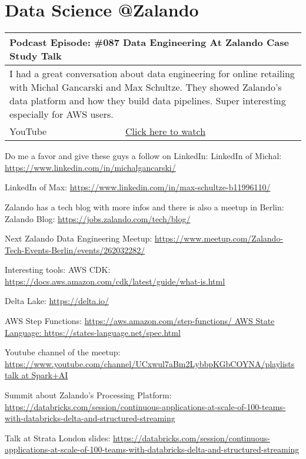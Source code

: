 \documentclass[12pt, numbers=noenddot]{scrreprt} %
\begin{document}
\section{Data Science @Zalando}

\begin{table}[h]
\begin{tabular}{ll}
\hline
\multicolumn{2}{l}{\textbf{Podcast Episode:} \#087 Data Engineering At Zalando Case Study Talk} \\ \hline
\multicolumn{2}{p{15cm}}{I had a great conversation about data engineering for online retailing with Michal Gancarski and Max Schultze. They showed Zalando's data platform and how they build data pipelines. 
Super interesting especially for AWS users. }         \\ \hline
\multicolumn{1}{l|}{YouTube}   & \href{https://youtu.be/IXOLsNA6Hm0}{Click here to watch}   \\  \hline
\end{tabular}
 \label{tbl:087Zalando}
\end{table}

Do me a favor and give these guys a follow on LinkedIn:
LinkedIn of Michal: \url{https://www.linkedin.com/in/michalgancarski/}

LinkedIn of Max: \url{https://www.linkedin.com/in/max-schultze-b11996110/}

Zalando has a tech blog with more infos and there is also a meetup in Berlin:
Zalando Blog: 
\url{https://jobs.zalando.com/tech/blog/}

Next Zalando Data Engineering Meetup: 
\url{https://www.meetup.com/Zalando-Tech-Events-Berlin/events/262032282/}

Interesting tools:
AWS CDK: 
\url{https://docs.aws.amazon.com/cdk/latest/guide/what-is.html}

Delta Lake: 
\url{https://delta.io/} 

AWS Step Functions: 
\url{https://aws.amazon.com/step-functions/ AWS State Language: https://states-language.net/spec.html} 

Youtube channel of the meetup: 
\url{https://www.youtube.com/channel/UCxwul7aBm2LybbpKGbCOYNA/playlists talk at Spark+AI} 

Summit about Zalando's Processing Platform: 
\url{https://databricks.com/session/continuous-applications-at-scale-of-100-teams-with-databricks-delta-and-structured-streaming} 

Talk at Strata London slides: 
\url{https://databricks.com/session/continuous-applications-at-scale-of-100-teams-with-databricks-delta-and-structured-streaming}
\end{document}
